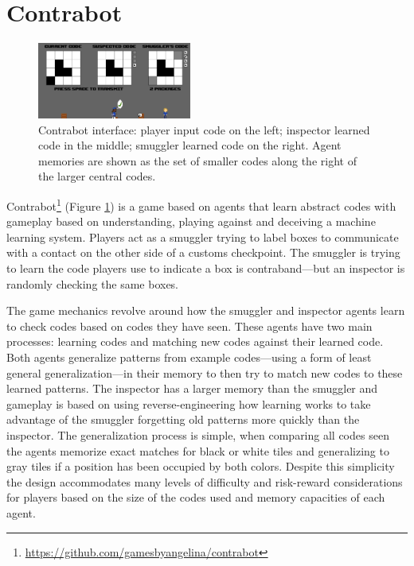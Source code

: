 \documentclass{sig-alternate}
\begin{document}
\section{Contrabot}

\begin{figure}[tb]
\centering
\includegraphics[width=0.45\textwidth]{images/contrabot}
\caption{{\sc Contrabot} interface: player input code on the left; inspector learned code in the middle; smuggler learned code on the right. 
Agent memories are shown as the set of smaller codes along the right of the larger central codes.}
\label{fig:contrabot}
\end{figure}

{\sc Contrabot}\footnote{\url{https://github.com/gamesbyangelina/contrabot}} (Figure \ref{fig:contrabot}) is a game based on agents that learn abstract codes with gameplay based on understanding, playing against and deceiving a machine learning system.
%
Players act as a smuggler trying to label boxes to communicate with a contact on the other side of a customs checkpoint.
The smuggler is trying to learn the code players use to indicate a box is contraband---but an inspector is randomly checking the same boxes.

The game mechanics revolve around how the smuggler and inspector agents learn to check codes based on codes they have seen.
These agents have two main processes: learning codes and matching new codes against their learned code.
Both agents generalize patterns from example codes---using a form of least general generalization---in their memory to then try to match new codes to these learned patterns.
The inspector has a larger memory than the smuggler and gameplay is based on using reverse-engineering how learning works to take advantage of the smuggler forgetting old patterns more quickly than the inspector.
%
The generalization process is simple, when comparing all codes seen the agents memorize exact matches for black or white tiles and generalizing to gray tiles if a position has been occupied by both colors.
Despite this simplicity the design accommodates many levels of difficulty and risk-reward considerations for players based on the size of the codes used and memory capacities of each agent.
\end{document}
